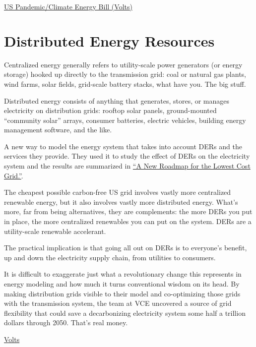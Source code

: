 \documentclass[
]{book}
\begin{document}
\href{https://www.volts.wtf/p/congress-might-pass-a-huge-energy}{US Pandemic/Climate Energy Bill (Volts)}

\hypertarget{distributed-energy-resources}{%
\chapter{Distributed Energy Resources}\label{distributed-energy-resources}}

Centralized energy generally refers to utility-scale power generators (or energy storage) hooked up directly to the transmission grid: coal or natural gas plants, wind farms, solar fields, grid-scale battery stacks, what have you. The big stuff.

Distributed energy consists of anything that generates, stores, or manages electricity on distribution grids: rooftop solar panels, ground-mounted ``community solar'' arrays, consumer batteries, electric vehicles, building energy management software, and the like.

A new way to model the energy system that takes into account DERs and the services they provide. They used it to study the effect of DERs on the electricity system and the results are summarized in \href{https://www.vibrantcleanenergy.com/wp-content/uploads/2020/12/WhyDERs_ES_Final.pdf}{``A New Roadmap for the Lowest Cost Grid.''}.

The cheapest possible carbon-free US grid involves vastly more centralized renewable energy, but it also involves vastly more distributed energy. What's more, far from being alternatives, they are complements: the more DERs you put in place, the more centralized renewables you can put on the system. DERs are a utility-scale renewable accelerant.

The practical implication is that going all out on DERs is to everyone's benefit, up and down the electricity supply chain, from utilities to consumers.

It is difficult to exaggerate just what a revolutionary change this represents in energy modeling and how much it turns conventional wisdom on its head. By making distribution grids visible to their model and co-optimizing those grids with the transmission system, the team at VCE uncovered a source of grid flexibility that could save a decarbonizing electricity system some half a trillion dollars through 2050. That's real money.

\href{https://www.volts.wtf/p/rooftop-solar-and-home-batteries}{Volts}
\end{document}
